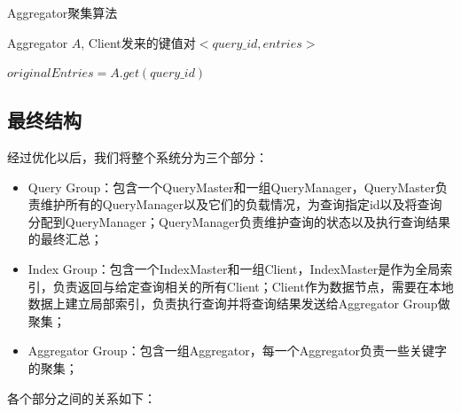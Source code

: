 \documentclass{elegantpaper}
\begin{document}
\begin{algorithm}

    \begin{algorithmic}[1]
        \caption{Aggregator聚集算法}
        \Require Aggregator $A$, Client发来的键值对$<query\_id, entries>$

                \State $originalEntries = A.get(query\_id)$
                    \Else
                    \EndIf
                \EndFor
            \Else
            \EndIf
        \EndFunction
        
    \end{algorithmic}
    
\end{algorithm}

\subsection{最终结构}

经过优化以后，我们将整个系统分为三个部分：

\begin{itemize}

    \item Query Group：包含一个QueryMaster和一组QueryManager，QueryMaster负责维护所有的QueryManager以及它们的负载情况，为查询指定id以及将查询分配到QueryManager；QueryManager负责维护查询的状态以及执行查询结果的最终汇总；

    \item Index Group：包含一个IndexMaster和一组Client，IndexMaster是作为全局索引，负责返回与给定查询相关的所有Client；Client作为数据节点，需要在本地数据上建立局部索引，负责执行查询并将查询结果发送给Aggregator Group做聚集；
    
    \item Aggregator Group：包含一组Aggregator，每一个Aggregator负责一些关键字的聚集；
    
\end{itemize}

\noindent 各个部分之间的关系如下：\\\\\\\\
\end{document}
